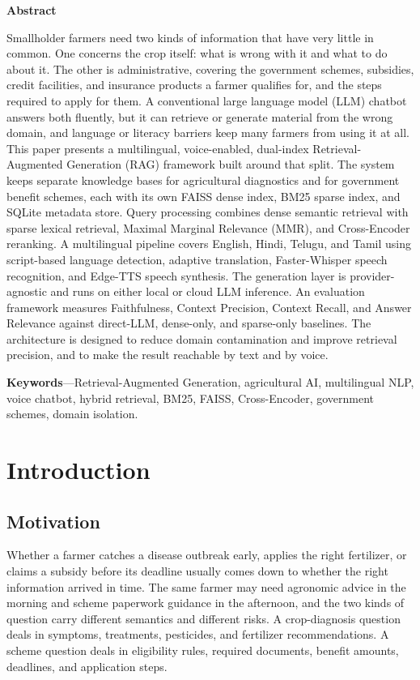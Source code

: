 \documentclass[10pt,twocolumn,letterpaper]{article}
\begin{document}
{\noindent\normalsize\bfseries Abstract\par}
\vspace{2pt}
\noindent Smallholder farmers need two kinds of information that have very little in common. One concerns the crop itself: what is wrong with it and what to do about it. The other is administrative, covering the government schemes, subsidies, credit facilities, and insurance products a farmer qualifies for, and the steps required to apply for them. A conventional large language model (LLM) chatbot answers both fluently, but it can retrieve or generate material from the wrong domain, and language or literacy barriers keep many farmers from using it at all. This paper presents a multilingual, voice-enabled, dual-index Retrieval-Augmented Generation (RAG) framework built around that split. The system keeps separate knowledge bases for agricultural diagnostics and for government benefit schemes, each with its own FAISS dense index, BM25 sparse index, and SQLite metadata store. Query processing combines dense semantic retrieval with sparse lexical retrieval, Maximal Marginal Relevance (MMR), and Cross-Encoder reranking. A multilingual pipeline covers English, Hindi, Telugu, and Tamil using script-based language detection, adaptive translation, Faster-Whisper speech recognition, and Edge-TTS speech synthesis. The generation layer is provider-agnostic and runs on either local or cloud LLM inference. An evaluation framework measures Faithfulness, Context Precision, Context Recall, and Answer Relevance against direct-LLM, dense-only, and sparse-only baselines. The architecture is designed to reduce domain contamination and improve retrieval precision, and to make the result reachable by text and by voice.

\vspace{6pt}
\noindent\textbf{Keywords}---Retrieval-Augmented Generation, agricultural AI, multilingual NLP, voice chatbot, hybrid retrieval, BM25, FAISS, Cross-Encoder, government schemes, domain isolation.
\vspace{6pt}

\section{Introduction}
\subsection{Motivation}
Whether a farmer catches a disease outbreak early, applies the right fertilizer, or claims a subsidy before its deadline usually comes down to whether the right information arrived in time. The same farmer may need agronomic advice in the morning and scheme paperwork guidance in the afternoon, and the two kinds of question carry different semantics and different risks. A crop-diagnosis question deals in symptoms, treatments, pesticides, and fertilizer recommendations. A scheme question deals in eligibility rules, required documents, benefit amounts, deadlines, and application steps.
\end{document}
